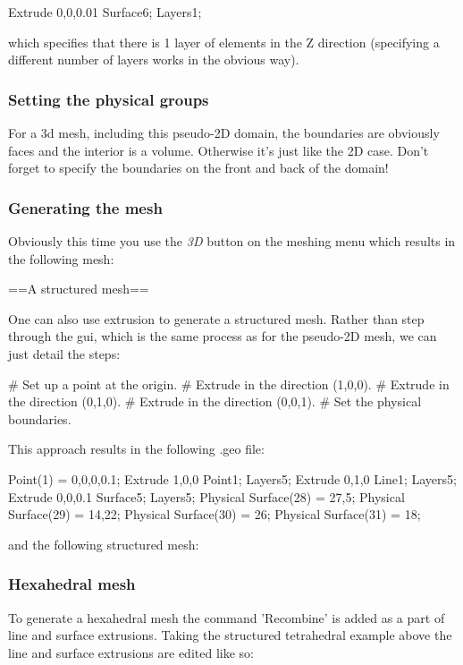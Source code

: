  Extrude {0,0,0.01} {
  Surface{6}; Layers{1};
 }

which specifies that there is 1 layer of elements in the Z direction (specifying a different number of layers works in the obvious way).

\subsubsection{Setting the physical groups}

For a 3d mesh, including this pseudo-2D domain, the boundaries are obviously faces and the interior is a volume. Otherwise it's just like the 2D case. Don't forget to specify the boundaries on the front and back of the domain!

\subsubsection{Generating the mesh}

Obviously this time you use the \textit{3D} button on the meshing menu which results in the following mesh:


==A structured mesh==

One can also use extrusion to generate a structured mesh. Rather than step through the gui, which is the same process as for the pseudo-2D mesh, we can just detail the steps:

\# Set up a point at the origin.
\# Extrude in the direction (1,0,0).
\# Extrude in the direction (0,1,0).
\# Extrude in the direction (0,0,1).
\# Set the physical boundaries.

This approach results in the following .geo file:

 Point(1) = {0,0,0,0.1};
 Extrude {1,0,0} {
   Point{1}; Layers{5};
 }
 Extrude {0,1,0} {
   Line{1}; Layers{5};
 }
 Extrude {0,0,0.1} {
   Surface{5}; Layers{5};
 }
 Physical Surface(28) = {27,5};
 Physical Surface(29) = {14,22};
 Physical Surface(30) = {26};
 Physical Surface(31) = {18};

and the following structured mesh:

\subsubsection{Hexahedral mesh}
To generate a hexahedral mesh the command 'Recombine' is added as a part of line and surface extrusions. Taking the structured tetrahedral example above the line and surface extrusions are edited like so:
 
